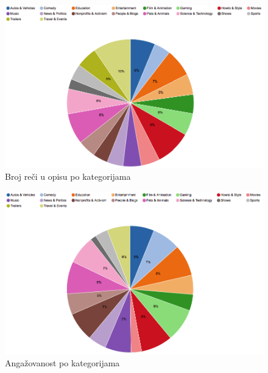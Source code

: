 \documentclass[a4paper]{article}
\theoremstyle{definition}
\begin{document}
\begin{figure}[H]
\begin{center}
    \includegraphics[width=1\textwidth]{categories_desc.png}
    \caption{Broj reči u opisu po kategorijama}
\end{center}
\end{figure}

\begin{figure}[H]
\begin{center}
    \includegraphics[width=1\textwidth]{categories_engagement.png}
    \caption{Angažovanost po kategorijama}
\end{center}
\end{figure}
\end{document}
